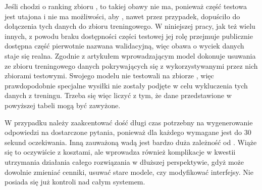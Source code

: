 Jeśli chodzi o ranking zbioru , to takiej obawy nie ma, ponieważ część testowa jest utajona i nie ma możliwości, aby , nawet przez przypadek, dopuściło do dołączenia tych danych do zbioru treningowego. W niniejszej pracy, jak też wielu innych, z powodu braku dostępności części testowej jej rolę przejmuje publicznie dostępna część pierwotnie nazwana walidacyjną, więc obawa o wyciek danych staje się realna. Zgodnie z artykułem wprowadzającym model \mbox{}   dokonuje usuwania ze zbioru treningowego danych pokrywających się z wykorzystywanymi przez nich zbiorami testowymi. Swojego modelu nie testowali na zbiorze , więc prawdopodobnie specjalne wysiłki nie zostały podjęte w celu wykluczenia tych danych z treningu. Trzeba się więc liczyć z tym, że dane przedstawione w powyższej tabeli mogą być zawyżone.

W przypadku  należy zaakcentować dość długi czas potrzebny na wygenerowanie odpowiedzi na dostarczone pytania, ponieważ dla każdego wymagane jest do 30 sekund oczekiwania. Inną zauważoną wadą jest bardzo duża zależność od . Wiąże się to oczywiście z kosztami, ale wprowadza również komplikacje w kwestii utrzymania działania całego rozwiązania w dłuższej perspektywie, gdyż  może dowolnie zmieniać cenniki, usuwać stare modele, czy modyfikować interfejsy. Nie posiada się już kontroli nad całym systemem.